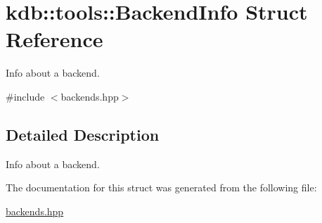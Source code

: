 \hypertarget{structkdb_1_1tools_1_1BackendInfo}{\section{kdb\-:\-:tools\-:\-:Backend\-Info Struct Reference}
\label{structkdb_1_1tools_1_1BackendInfo}
}


Info about a backend.  




{\ttfamily \#include $<$backends.\-hpp$>$}



\subsection{Detailed Description}
Info about a backend. 

The documentation for this struct was generated from the following file\-:\begin{DoxyCompactItemize}
\item 
\hyperlink{backends_8hpp}{backends.\-hpp}\end{DoxyCompactItemize}
